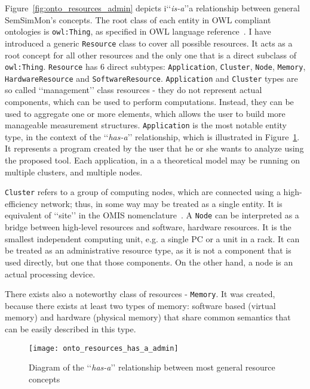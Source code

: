 Figure~\ref{fig:onto_resources_admin} depicts i\lq\lq{}\emph{is-a}\rq\rq{}a relationship between general SemSimMon\rq{}s concepts. The root class of each entity in OWL compliant ontologies is \texttt{owl:Thing}, as specified in OWL language reference~\cite{owlRef:2009}. I have introduced a generic \texttt{Resource} class to cover all possible resources. It acts as a root concept for all other resources and the only one that is a direct subclass of \texttt{owl:Thing}. \texttt{Resource} has 6 direct subtypes: \texttt{Application}, \texttt{Cluster}, \texttt{Node}, \texttt{Memory}, \texttt{HardwareResource} and \texttt{SoftwareResource}. \texttt{Application} and \texttt{Cluster} types are so called \lq\lq{}management\rq\rq{} class resources - they do not represent actual components, which can be used to perform computations. Instead, they can be used to aggregate one or more elements, which allows the user to build more manageable measurement structures. \texttt{Application} is the most notable entity type, in the context of the \lq\lq{}\emph{has-a}\rq\rq{} relationship, which is illustrated in Figure~\ref{fig:onto_resources_has_a_admin}. It represents a program created by the user that he or she wants to analyze using the proposed tool. Each application, in a a theoretical model may be running on multiple clusters, and multiple nodes.

\texttt{Cluster} refers to a group of computing nodes, which are connected using a high-efficiency network; thus, in some way may be treated as a single entity. It is equivalent of \lq\lq{}site\rq\rq{} in the OMIS nomenclature~\cite{tl9702e}. A \texttt{Node} can be interpreted as a bridge between high-level resources and software, hardware resources. It is the smallest independent computing unit, e.g. a single PC or a unit in a rack. It can be treated as an administrative resource type, as it is not a component that is used directly, but one that those components. On the other hand, a node is an actual processing device.

There exists also a noteworthy class of resources - \texttt{Memory}. It was created, because there exists at least two types of memory: software based (virtual memory) and hardware (physical memory) that share common semantics that can be easily described in this type.

\begin{figure}[ht]
\centering
\texttt{[image: onto\_resources\_has\_a\_admin]}
\caption{Diagram of the \lq\lq{}\emph{has-a}\rq\rq{} relationship between most general resource concepts}
\label{fig:onto_resources_has_a_admin}
\end{figure}


